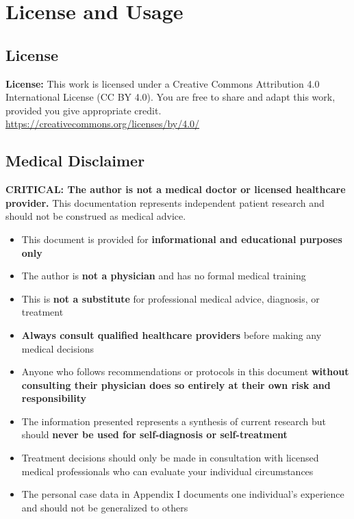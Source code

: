 \chapter*{License and Usage}

\section*{License}

\noindent\textbf{License:} This work is licensed under a Creative Commons Attribution 4.0 International License (CC BY 4.0). You are free to share and adapt this work, provided you give appropriate credit. \url{https://creativecommons.org/licenses/by/4.0/}

\section*{Medical Disclaimer}

\textbf{CRITICAL: The author is not a medical doctor or licensed healthcare provider.} This documentation represents independent patient research and should not be construed as medical advice.

\begin{warning}
\begin{itemize}
\item This document is provided for \textbf{informational and educational purposes only}
\item The author is \textbf{not a physician} and has no formal medical training
\item This is \textbf{not a substitute} for professional medical advice, diagnosis, or treatment
\item \textbf{Always consult qualified healthcare providers} before making any medical decisions
\item Anyone who follows recommendations or protocols in this document \textbf{without consulting their physician does so entirely at their own risk and responsibility}
\item The information presented represents a synthesis of current research but should \textbf{never be used for self-diagnosis or self-treatment}
\item Treatment decisions should only be made in consultation with licensed medical professionals who can evaluate your individual circumstances
\item The personal case data in Appendix I documents one individual's experience and should not be generalized to others
\end{itemize}
\end{warning}

